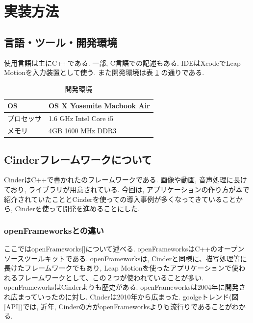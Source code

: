 \documentclass{funthesis}
\begin{document}

\section{実装方法}

\subsection{言語・ツール・開発環境}
使用言語は主にC++である. 一部, C言語での記述もある. IDEはXcodeでLeap Motionを入力装置として使う. また開発環境は表 \ref{env} の通りである. 

\begin{table}[H]
\begin{center}
\caption{開発環境}
  \begin{tabular}{ll}
  
   \hline
OS & OS X  Yosemite Macbook Air \\ 
  \hline
プロセッサ & 1.6 GHz Intel Core i5\\ 
  \hline
メモリ & 4GB 1600 MHz DDR3\\ 
  \hline
  \end{tabular}
  \label{env}
  \end{center}
\end{table}


\subsection{Cinderフレームワークについて}
CinderはC++で書かれたのフレームワークである. 画像や動画, 音声処理に長けており, ライブラリが用意されている. 今回は, アプリケーションの作り方が本で紹介されていたこととCinderを使っての導入事例が多くなってきていることから, Cinderを使って開発を進めることにした. 



\subsubsection{openFrameworksとの違い}
ここではopenFrameworks[]について述べる. openFrameworksはC++のオープンソースツールキットである. openFrameworksは, Cinderと同様に、描写処理等に長けたフレームワークでもあり, Leap Motionを使ったアプリケーションで使われるフレームワークとして、この２つが使われていることが多い. 
openFrameworksはCinderよりも歴史がある. openFrameworksは2004年に開発され広まっていったのに対し. Cinderは2010年から広まった. goolgeトレンド(図\ref{API})では, 近年, Cinderの方がopenFrameworksよりも流行りであることがわかる. 
\end{document}
